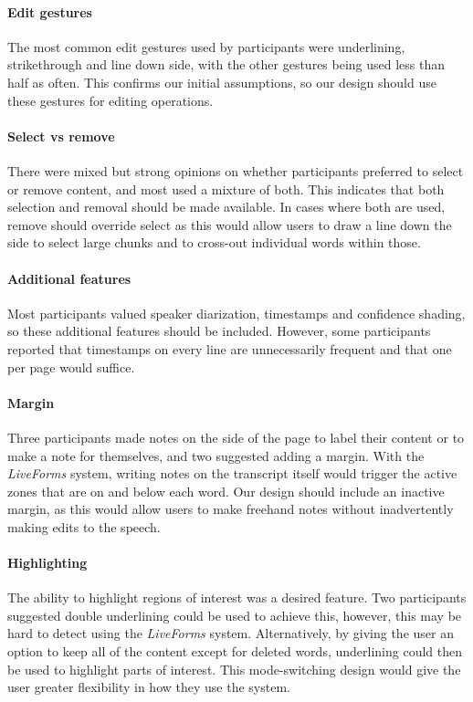 \paragraph{Edit gestures}
The most common edit gestures used by participants were underlining, strikethrough and line down side, with the other
gestures being used less than half as often.  This confirms our initial assumptions, so our design should use these
gestures for editing operations.

\paragraph{Select vs remove}
There were mixed but strong opinions on whether participants preferred to select or remove content, and most used a
mixture of both.  This indicates that both selection and removal should be made available. In cases where both are
used, remove should override select as this would allow users to draw a line down the side to select large chunks and 
to cross-out individual words within those.


\paragraph{Additional features}
Most participants valued speaker diarization, timestamps and confidence shading, so these additional features should be
included.  However, some participants reported that timestamps on every line are unnecessarily frequent and that one
per page would suffice.

\paragraph{Margin}
Three participants made notes on the side of the page to label their content or to make a note for themselves, and two
suggested adding a margin. With the \textit{Live\texttrademark Forms} system, writing notes on the transcript itself would trigger the active
zones that are on and below each word. Our design should include an inactive margin, as this would allow users to make
freehand notes without inadvertently making edits to the speech.

\paragraph{Highlighting}
The ability to highlight regions of interest was a desired feature. Two participants suggested double underlining could
be used to achieve this, however, this may be hard to detect using the \textit{Live\texttrademark Forms} system.
Alternatively, by giving the user an option to keep all of the content except for deleted words, underlining could then
be used to highlight parts of interest. This mode-switching design would give the user greater flexibility in how they
use the system.


















